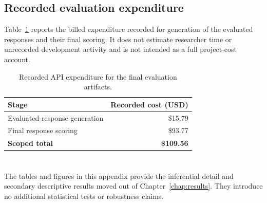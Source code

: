 \section{Recorded evaluation expenditure}

Table~\ref{tab:appendix_costs} reports the billed expenditure recorded for generation of the evaluated responses and their final scoring. It does not estimate researcher time or unrecorded development activity and is not intended as a full project-cost account.

\begin{table}[htbp]
\centering
\caption{Recorded API expenditure for the final evaluation artifacts.}
\label{tab:appendix_costs}
\begin{tabular}{@{}lr@{}}
\toprule
\textbf{Stage} & \textbf{Recorded cost (USD)} \\
\midrule
Evaluated-response generation & \$15.79 \\
Final response scoring & \$93.77 \\
\midrule
\textbf{Scoped total} & \textbf{\$109.56} \\
\bottomrule
\end{tabular}
\end{table}

\chapter[Supplementary Results]{}
\label{app:supplementary_results}

\begin{revisionblock}
The tables and figures in this appendix provide the inferential detail and secondary descriptive results moved out of Chapter~\ref{chap:results}. They introduce no additional statistical tests or robustness claims.
\end{revisionblock}

\section[Primary-test detail]{}
\label{app:supplementary_primary_tests}

